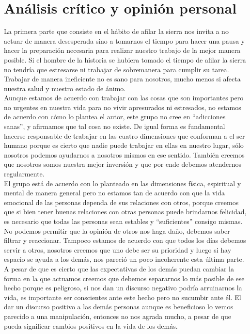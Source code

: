 \documentclass[onecolumn]{article} %
\begin{document}
	\section{Análisis crítico y opinión personal}
	
	La primera parte que consiste en el hábito de afilar la sierra nos invita a no actuar de manera desesperada sino a tomarnos el tiempo para hacer una pausa y hacer la preparación necesaria para realizar nuestro trabajo de la mejor manera posible. Si el hombre de la historia se hubiera tomado el tiempo de afilar la sierra no tendría que estresarse ni trabajar de sobremanera para cumplir su tarea. Trabajar de manera ineficiente no es sano para nosotros, mucho menos si afecta nuestra salud y nuestro estado de ánimo.\\
	
	Aunque estamos de acuerdo con trabajar con las cosas que son importantes pero no urgentes en nuestra vida para no vivir apresurados ni estresados, no estamos de acuerdo con cómo lo plantea el autor, este grupo no cree en ``adicciones sanas'', y afirmamos que tal cosa no existe. De igual forma es fundamental hacerse responsable de trabajar en las cuatro dimensiones que conforman a el ser humano porque es cierto que nadie puede trabajar en ellas en nuestro lugar, sólo nosotros podemos ayudarnos a nosotros mismos en ese sentido. También creemos que nosotros somos nuestra mejor inversión y que por ende debemos atendernos regularmente.\\
	
	El grupo está de acuerdo con lo planteado en las dimensiones física, espiritual y mental de manera general pero no estamos tan de acuerdo con que la vida emocional de las personas dependa de sus relaciones con otros, porque creemos que si bien tener buenas relaciones con otras personas puede brindarnos felicidad, es necesario que todas las personas sean estables y ``suficientes'' consigo mismas. No podemos permitir que la opinión de otros nos haga daño, debemos saber filtrar y reaccionar. Tampoco estamos de acuerdo con que todos los días debemos servir a otros, nosotros creemos que uno debe ser su prioridad y luego si hay espacio se ayuda a los demás, nos pareció un poco incoherente esta última parte. \\
	
	A pesar de que es cierto que las expectativas de los demás puedan cambiar la forma en la que actuamos creemos que debemos separarnos lo más posible de ese hecho porque es peligroso, si nos dan un discurso negativo podría arruinarnos la vida, es importante ser conscientes ante este hecho pero no sucumbir ante él. El dar un discurso positivo a las demás personas aunque es beneficioso lo vemos parecido a una manipulación, entonces no nos agrada mucho, a pesar de que pueda significar cambios positivos en la vida de los demás. 
	
\end{document}
